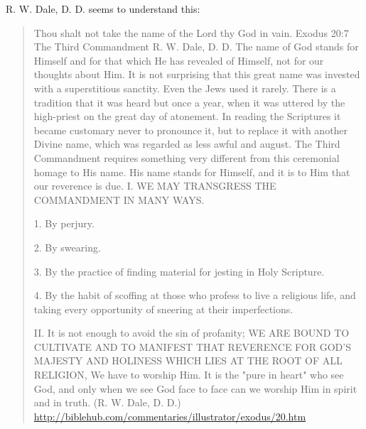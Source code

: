 \documentclass[11pt]{article}
\begin{document}
\begin{thebibliography}{37}
R. W. Dale, D. D. seems to understand this:
\begin{quote}
Thou shalt not take the name of the Lord thy God in vain.\newline
Exodus 20:7\newline
The Third Commandment\newline
R. W. Dale, D. D.\newline
The name of God stands for Himself and for that which He has revealed of Himself, not for our thoughts about Him. It is not surprising that this great name was invested with a superstitious sanctity. Even the Jews used it rarely. There is a tradition that it was heard but once a year, when it was uttered by the high-priest on the great day of atonement. In reading the Scriptures it became customary never to pronounce it, but to replace it with another Divine name, which was regarded as less awful and august. The Third Commandment requires something very different from this ceremonial homage to His name. His name stands for Himself, and it is to Him that our reverence is due. \newline \newline
I. WE MAY TRANSGRESS THE COMMANDMENT IN MANY WAYS.\newline

1. By perjury.\newline

2. By swearing.\newline

3. By the practice of finding material for jesting in Holy Scripture.\newline

4. By the habit of scoffing at those who profess to live a religious life, and taking every opportunity of sneering at their imperfections.\newline

II. It is not enough to avoid the sin of profanity; WE ARE BOUND TO CULTIVATE AND TO MANIFEST THAT REVERENCE FOR GOD'S MAJESTY AND HOLINESS WHICH LIES AT THE ROOT OF ALL RELIGION, We have to worship Him. It is the "pure in heart" who see God, and only when we see God face to face can we worship Him in spirit and in truth.\newline
(R. W. Dale, D. D.)
\url{http://biblehub.com/commentaries/illustrator/exodus/20.htm}
\end{quote}


\end{thebibliography}
\end{document}
